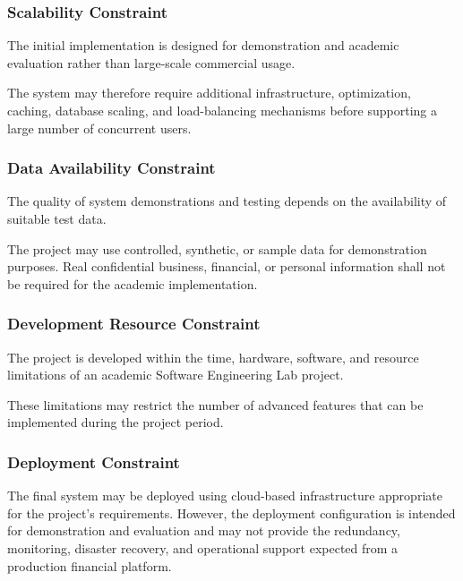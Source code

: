 \subsubsection{Scalability Constraint}

The initial implementation is designed for demonstration and academic
evaluation rather than large-scale commercial usage.

The system may therefore require additional infrastructure,
optimization, caching, database scaling, and load-balancing mechanisms
before supporting a large number of concurrent users.

\subsubsection{Data Availability Constraint}

The quality of system demonstrations and testing depends on the
availability of suitable test data.

The project may use controlled, synthetic, or sample data for
demonstration purposes. Real confidential business, financial, or
personal information shall not be required for the academic
implementation.

\subsubsection{Development Resource Constraint}

The project is developed within the time, hardware, software, and
resource limitations of an academic Software Engineering Lab project.

These limitations may restrict the number of advanced features that can
be implemented during the project period.

\subsubsection{Deployment Constraint}

The final system may be deployed using cloud-based infrastructure
appropriate for the project's requirements. However, the deployment
configuration is intended for demonstration and evaluation and may not
provide the redundancy, monitoring, disaster recovery, and operational
support expected from a production financial platform.